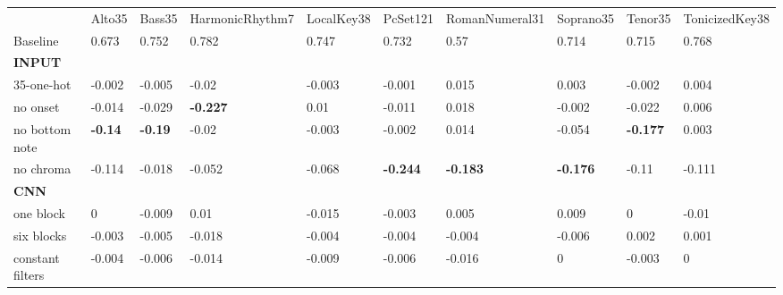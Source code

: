 \begin{tabular}{llllllllll}
                                & Alto35         & Bass35         & HarmonicRhythm7 & LocalKey38      & PcSet121        & RomanNumeral31  & Soprano35       & Tenor35         & TonicizedKey38  \\
Baseline                        & 0.673          & 0.752          & 0.782           & 0.747           & 0.732           & 0.57            & 0.714           & 0.715           & 0.768           \\
\textbf{INPUT}                  &                &                &                 &                 &                 &                 &                 &                 &                 \\
35-one-hot                      & -0.002         & -0.005         & -0.02           & -0.003          & -0.001          & 0.015           & 0.003           & -0.002          & 0.004           \\
no onset                        & -0.014         & -0.029         & \textbf{-0.227} & 0.01            & -0.011          & 0.018           & -0.002          & -0.022          & 0.006           \\
no bottom note                  & \textbf{-0.14} & \textbf{-0.19} & -0.02           & -0.003          & -0.002          & 0.014           & -0.054          & \textbf{-0.177} & 0.003           \\
no chroma                       & -0.114         & -0.018         & -0.052          & -0.068          & \textbf{-0.244} & \textbf{-0.183} & \textbf{-0.176} & -0.11           & -0.111          \\
\textbf{CNN}                    &                &                &                 &                 &                 &                 &                 &                 &                 \\
one block                       & 0              & -0.009         & 0.01            & -0.015          & -0.003          & 0.005           & 0.009           & 0               & -0.01           \\
six blocks                      & -0.003         & -0.005         & -0.018          & -0.004          & -0.004          & -0.004          & -0.006          & 0.002           & 0.001           \\
constant filters                & -0.004         & -0.006         & -0.014          & -0.009          & -0.006          & -0.016          & 0               & -0.003          & 0               \\

\end{tabular}
